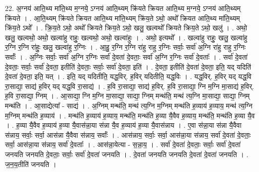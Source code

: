 \documentclass[17pt]{extarticle}
\begin{document}
22. अ॒ग्नय॑ आति॒थ्य मा॑ति॒थ्य म॒ग्नये॒ ऽग्नय॑ आति॒थ्यम् क्रि॑यते क्रियत आति॒थ्य म॒ग्नये॒ ऽग्नय॑ आति॒थ्यम् क्रि॑यते । . आ॒ति॒थ्यम् क्रि॑यते क्रियत आति॒थ्य मा॑ति॒थ्यम् क्रि॑य॒ते ऽथो॒ अथो᳚ क्रियत आति॒थ्य मा॑ति॒थ्यम् क्रि॑य॒ते ऽथो᳚ । . क्रि॒य॒ते ऽथो॒ अथो᳚ क्रियते क्रिय॒ते ऽथो॒ खलु॒ खल्वथो᳚ क्रियते क्रिय॒ते ऽथो॒ खलु॑ । . अथो॒ खलु॒ खल्वथो॒ अथो॒ खल्वा॑हु राहुः॒ खल्वथो॒ अथो॒ खल्वा॑हुः । . अथो॒ इत्यथो᳚ । . खल्वा॑हु राहुः॒ खलु॒ खल्वा॑हु र॒ग्नि र॒ग्नि रा॑हुः॒ खलु॒ खल्वा॑हु र॒ग्निः । . आ॒हु॒ र॒ग्नि र॒ग्नि रा॑हु राहु र॒ग्निः सर्वाः॒ सर्वा॑ अ॒ग्नि रा॑हु राहु र॒ग्निः सर्वाः᳚ । . अ॒ग्निः सर्वाः॒ सर्वा॑ अ॒ग्नि र॒ग्निः सर्वा॑ दे॒वता॑ दे॒वताः॒ सर्वा॑ अ॒ग्नि र॒ग्निः सर्वा॑ दे॒वताः᳚ । . सर्वा॑ दे॒वता॑ दे॒वताः॒ सर्वाः॒ सर्वा॑ दे॒वता॒ इतीति॑ दे॒वताः॒ सर्वाः॒ सर्वा॑ दे॒वता॒ इति॑ । . दे॒वता॒ इतीति॑ दे॒वता॑ दे॒वता॒ इति॒ यद् यदिति॑ दे॒वता॑ दे॒वता॒ इति॒ यत् । . इति॒ यद् यदितीति॒ यद्ध॒विर्. ह॒विर् यदितीति॒ यद्ध॒विः । . यद्ध॒विर्. ह॒विर् यद् यद्ध॒वि रा॒साद्या॒ साद्य॑ ह॒विर् यद् यद्ध॒वि रा॒साद्य॑ । . ह॒वि रा॒साद्या॒ साद्य॑ ह॒विर्. ह॒वि रा॒साद्या॒ ग्नि म॒ग्नि मा॒साद्य॑ ह॒विर्. ह॒वि रा॒साद्या॒ ग्निम् । . आ॒साद्या॒ ग्नि म॒ग्नि मा॒साद्या॒ साद्या॒ ग्निम् मन्थ॑ति॒ मन्थ॑ त्य॒ग्नि मा॒साद्या॒ साद्या॒ ग्निम् मन्थ॑ति । . आ॒साद्येत्या᳚ - साद्य॑ । . अ॒ग्निम् मन्थ॑ति॒ मन्थ॑ त्य॒ग्नि म॒ग्निम् मन्थ॑ति ह॒व्याय॑ ह॒व्याय॒ मन्थ॑ त्य॒ग्नि म॒ग्निम् मन्थ॑ति ह॒व्याय॑ । . मन्थ॑ति ह॒व्याय॑ ह॒व्याय॒ मन्थ॑ति॒ मन्थ॑ति ह॒व्या यै॒वैव ह॒व्याय॒ मन्थ॑ति॒ मन्थ॑ति ह॒व्या यै॒व । . ह॒व्या यै॒वैव ह॒व्याय॑ ह॒व्या यै॒वास॑न्ना॒या स॑न्ना यै॒व ह॒व्याय॑ ह॒व्या यै॒वास॑न्नाय । . ए॒वा स॑न्ना॒या स॑न्ना यै॒वैवा स॑न्नाय॒ सर्वाः॒ सर्वा॒ आस॑न्ना यै॒वैवा स॑न्नाय॒ सर्वाः᳚ । . आस॑न्नाय॒ सर्वाः॒ सर्वा॒ आस॑न्ना॒या स॑न्नाय॒ सर्वा॑ दे॒वता॑ दे॒वताः॒ सर्वा॒ आस॑न्ना॒या स॑न्नाय॒ सर्वा॑ दे॒वताः᳚ । . आस॑न्ना॒येत्या - स॒न्ना॒य॒ । . सर्वा॑ दे॒वता॑ दे॒वताः॒ सर्वाः॒ सर्वा॑ दे॒वता॑ जनयति जनयति दे॒वताः॒ सर्वाः॒ सर्वा॑ दे॒वता॑ जनयति । . दे॒वता॑ जनयति जनयति दे॒वता॑ दे॒वता॑ जनयति । . ज॒न॒य॒तीति॑ जनयति । \newline
\pagebreak
{}
\end{document}
